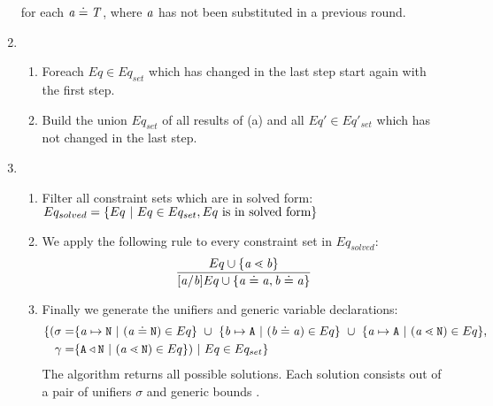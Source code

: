 \begin{enumerate}
      for each $\mathit{ a } \doteq \mathit{T}$, where $\mathit{ a }$ has not been substituted in a previous round.

\item 
    \begin{enumerate}
    \item Foreach $Eq \in Eq_{set}$ which has changed in the last step
      start again with the first step.
    \item Build the union $Eq_{set}$ of all results of (a) and all $Eq' \in
      Eq'_{set}$ which has not changed in the last step.
    \end{enumerate}
\item
\begin{enumerate}
  \item Filter all constraint sets which are in solved
  form:\\
$Eq_{solved} = \{  Eq \ | \ Eq \in Eq_{set}, Eq \ \text{is in solved form} \}$
\item We apply the following rule to every constraint set in $Eq_{solved}$:
\begin{align*}
\ddfrac{
  Eq \cup \set{ \tv{a} \lessdot \tv{b} } %
}{
  [\tv{a}/\tv{b}]Eq \cup \set{ \tv{a} \doteq \tv{a}, \tv{b} \doteq \tv{a} }
}
\end{align*}
\item Finally we generate the unifiers and generic variable declarations:
\begin{align*}
  \set{ 
    (\sigma = &
    \set{\tv{a} \mapsto \type{N} \ | \ (\tv{a} \doteq \type{N}) \in Eq} \ \cup \  \set{\tv{b} \mapsto \type{A} \ | \ (\tv{b} \doteq \tv{a}) \in Eq} \ \cup \ 
    \set{\tv{a} \mapsto \type{A} \ | \ (\tv{a} \lessdot \type{N}) \in Eq }, \\
   \unifyGenerics{} = &
  \set{\type{A} \triangleleft \type{N} \ | \ (\tv{a} \lessdot \type{N}) \in Eq}) 
   \ | \ Eq \in Eq_{set}  }
\end{align*}
The \unify{} algorithm returns all possible solutions.
Each solution consists out of a pair of unifiers $\sigma$ and generic bounds \unifyGenerics{}.
\end{enumerate}
\end{enumerate}

